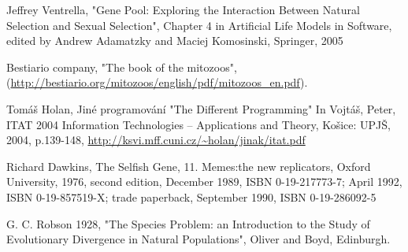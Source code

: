 \documentclass[a4paper,12pt]{report}
\begin{document}
\begin{thebibliography}{99}
Jeffrey Ventrella, "Gene Pool: Exploring the Interaction Between Natural Selection and Sexual Selection", Chapter 4 in Artificial Life Models in Software, edited by Andrew Adamatzky and Maciej Komosinski, Springer, 2005

Bestiario company, "The book of the mitozoos", (\url{http://bestiario.org/mitozoos/english/pdf/mitozoos\_en.pdf}). 

Tomáš Holan, Jiné programování "The Different Programming" In Vojtáš, Peter, ITAT 2004 Information Technologies – Applications and Theory, Košice: UPJŠ, 2004, p.139-148, \url{http://ksvi.mff.cuni.cz/~holan/jinak/itat.pdf}

Richard Dawkins, The Selfish Gene, 11. Memes:the new replicators, Oxford University, 1976, second edition, December 1989, ISBN 0-19-217773-7; April 1992, ISBN 0-19-857519-X; trade paperback, September 1990, ISBN 0-19-286092-5

 G. C. Robson 1928, "The Species Problem: an Introduction to the Study of Evolutionary Divergence in Natural Populations", Oliver and Boyd, Edinburgh.


\end{thebibliography}
\end{document}

